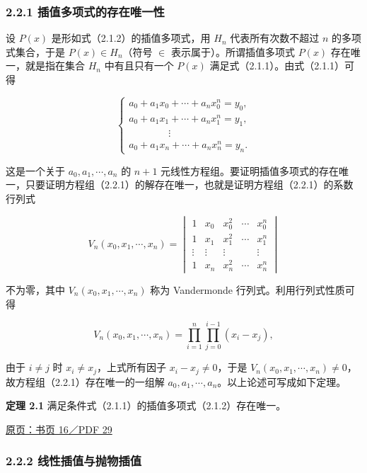 \documentclass[
  10pt,
  fontset=fandol]{ctexart}
\begin{document}
\subsubsection{2.2.1 插值多项式的存在唯一性}\label{ux63d2ux503cux591aux9879ux5f0fux7684ux5b58ux5728ux552fux4e00ux6027}

设 \(P(x)\) 是形如式（2.1.2）的插值多项式，用 \(H_n\) 代表所有次数不超过 \(n\) 的多项式集合，于是 \(P(x)\in H_n\)（符号 \(\in\) 表示属于）。所谓插值多项式 \(P(x)\) 存在唯一，就是指在集合 \(H_n\) 中有且只有一个 \(P(x)\) 满足式（2.1.1）。由式（2.1.1）可得

\[
\begin{cases}
a_0+a_1x_0+\cdots+a_nx_0^n=y_0,\\
a_0+a_1x_1+\cdots+a_nx_1^n=y_1,\\
\qquad\qquad\vdots\\
a_0+a_1x_n+\cdots+a_nx_n^n=y_n.
\end{cases}
\tag{2.2.1}
\]

这是一个关于 \(a_0,a_1,\cdots,a_n\) 的 \(n+1\) 元线性方程组。要证明插值多项式的存在唯一，只要证明方程组（2.2.1）的解存在唯一，也就是证明方程组（2.2.1）的系数行列式

\[
V_n(x_0,x_1,\cdots,x_n)=
\begin{vmatrix}
1 & x_0 & x_0^2 & \cdots & x_0^n\\
1 & x_1 & x_1^2 & \cdots & x_1^n\\
\vdots & \vdots & \vdots & & \vdots\\
1 & x_n & x_n^2 & \cdots & x_n^n
\end{vmatrix}
\tag{2.2.2}
\]

不为零，其中 \(V_n(x_0,x_1,\cdots,x_n)\) 称为 Vandermonde 行列式。利用行列式性质可得

\[
V_n(x_0,x_1,\cdots,x_n)
=\prod_{i=1}^{n}\prod_{j=0}^{i-1}(x_i-x_j),
\]

由于 \(i\ne j\) 时 \(x_i\ne x_j\)，上式所有因子 \(x_i-x_j\ne0\)，于是 \(V_n(x_0,x_1,\cdots,x_n)\ne0\)，故方程组（2.2.1）存在唯一的一组解 \(a_0,a_1,\cdots,a_n\)。以上论述可写成如下定理。

\textbf{定理 2.1} 满足条件式（2.1.1）的插值多项式（2.1.2）存在唯一。

\href{../../source-images/pdf-029.jpeg}{原页：书页 16／PDF 29}

\subsubsection{2.2.2 线性插值与抛物插值}\label{ux7ebfux6027ux63d2ux503cux4e0eux629bux7269ux63d2ux503c}
\end{document}
